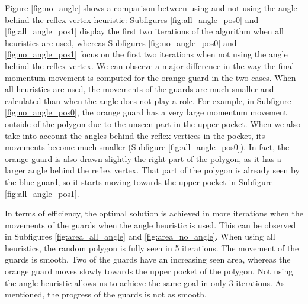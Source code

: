 Figure \ref{fig:no_angle} shows a comparison between using and not using the angle behind the reflex vertex heuristic: Subfigures \ref{fig:all_angle_pos0} and \ref{fig:all_angle_pos1} display the first two iterations of the algorithm when all heuristics are used, whereas  Subfigures \ref{fig:no_angle_pos0} and \ref{fig:no_angle_pos1} focus on the first two iterations when not using the angle behind the reflex vertex.
We can observe a major difference in the way the final momentum movement is computed for the orange guard in the two cases. When all heuristics are used, the movements of the guards are much smaller and calculated than when the angle does not play a role. For example, in Subfigure \ref{fig:no_angle_pos0}, the orange guard has a very large momentum movement outside of the polygon due to the unseen part in the upper pocket. When we also take into account the angles behind the reflex vertices in the pocket, its movements become much smaller (Subfigure \ref{fig:all_angle_pos0}). In fact, the orange guard is also drawn slightly the right part of the polygon, as it has a larger angle behind the reflex vertex. That part of the polygon is already seen by the blue guard, so it starts moving towards the upper pocket in Subfigure \ref{fig:all_angle_pos1}.

In terms of efficiency, the optimal solution is achieved in more iterations when the movements of the guards when the angle heuristic is used. This can be observed in Subfigures \ref{fig:area_all_angle} and \ref{fig:area_no_angle}. When using all heuristics, the random polygon is fully seen in 5 iterations. The movement of the guards is smooth. Two of the guards have an increasing seen area, whereas the orange guard moves slowly towards the upper pocket of the polygon. Not using the angle heuristic allows us to achieve the same goal in only 3 iterations. As mentioned, the progress of the guards is not as smooth.


